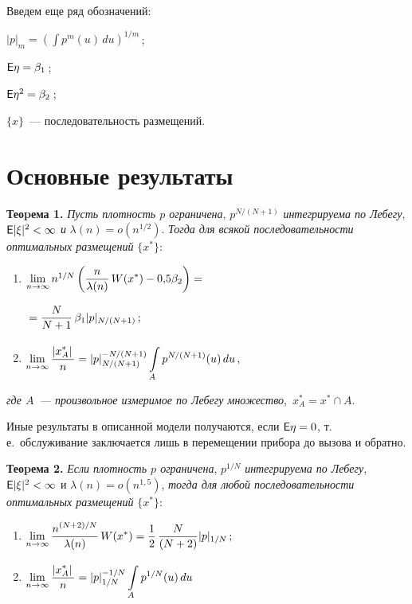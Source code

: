 \begin{multicols}{2}
Введем еще ряд обозначений:

$|p|_m=\left(\int p^m(u)\,du\right)^{1/m}$\,;

${\sf E}\eta=\beta_1$\,;

${\sf E}\eta^2=\beta_2$\,;

$\{x\}$~--- последовательность размещений.

\section{Основные результаты}

\noindent
\textbf{Теоpема 1.} {\it Пусть плотность $p$ ограничена}, $p^{N/(N+1)}$ {\it интегрируема по
Лебегу}, ${\sf E}|\xi|^2<\infty$ {\it и} $\lambda(n)=o(n^{1/2})$. {\it Тогда для всякой
последовательности оптимальных размещений} $\{x^*\}:$
\begin{enumerate}[(1)]
\item $\lim\limits_{n\rightarrow
\infty}n^{1/N}\left(\displaystyle\displaystyle\frac{\displaystyle n\mathstrut}{\displaystyle \lambda(n)\mathstrut}\, W(x^*)-0{,}5\beta_2\right)={}$

\noindent
\hfill${}=\displaystyle
\displaystyle\frac{\displaystyle N\mathstrut}{\displaystyle N+1\mathstrut}\,\beta_1 |p|_{N/(N+1)}\,;$\\
\item
$\lim\limits_{n\rightarrow\infty}\displaystyle\displaystyle\frac{\displaystyle \left|x_A^*\right|\mathstrut}{\displaystyle n\mathstrut}=|p|_{N/(N+1)}^{-N/(N+1)}\int\limits_{A}^{}p^{N/(N+1)}(u)\,du\,,$
\end{enumerate}
{\it где $A$~--- произвольное измеримое по Лебегу множество},\
$x_A^*=x^*\cap A$.

\smallskip
Иные результаты в описанной модели получаются, если ${\sf E} \eta=0$, т.\,е.\ обслуживание заключается
лишь в перемещении прибора до вызова и обратно.

\smallskip

\noindent
\textbf{Теоpема 2.} {\it Если плотность $p$ ограничена}, $p^{1/N}$ {\it интегрируема по
Лебегу}, ${{\sf E}}|\xi|^2<\infty$ и $\lambda(n)= o(n^{1{,}5})$, {\it тогда для любой
последовательности оптимальных размещений} $\{x^*\}$:
{ %
\begin{enumerate}[(1)]
\item
$\lim\limits_{n\rightarrow
\infty}\displaystyle\displaystyle\frac{\displaystyle n^{(N+2)/N}\mathstrut}{\displaystyle \lambda(n)\mathstrut}\, W(x^*)=\displaystyle\displaystyle\frac{\displaystyle 1\mathstrut}{\displaystyle 2\mathstrut}\,
\displaystyle\displaystyle\frac{\displaystyle N\mathstrut}{\displaystyle (N+2)\mathstrut} |p|_{1/N}\,;$
\item
$\lim\limits_{n\rightarrow\infty}\displaystyle\displaystyle\frac{\displaystyle \left|x_A^*\right|\mathstrut}{\displaystyle n\mathstrut}=|p|_{1/N}^{-1/N}\int\limits_{A}^{}p^{1/N}(u)\,du$
\end{enumerate}}


\end{multicols}
